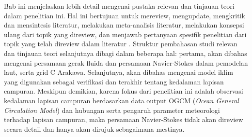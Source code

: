 \vspace{1.5pc}
\begin{spacing}{1.5}
	
	Bab ini menjelaskan lebih detail mengenai pustaka relevan dan tinjauan teori dalam penelitian ini. Hal ini bertujuan untuk mereview, mengupdate, mengkritik dan mensintesis literatur, melakukan meta-analisis literatur, melakukan konsepsi ulang dari topik yang direview, dan menjawab pertanyaan spesifik penelitian dari topik yang telah direview dalam literatur . Struktur pembahasan studi relevan dan tinjauan teori selanjutnya dibagi dalam beberapa hal: pertama, akan dibahas mengenai persamaan gerak fluida dan persamaan Navier-Stokes dalam pemodelan laut, serta grid C Arakawa. Selanjutnya, akan dibahas mengenai model iklim yang digunakan sebagai verifikasi dan terakhir tentang kedalaman lapisan campuran. Meskipun demikian, karena fokus dari penelitian ini adalah observasi kedalaman lapisan campuran berdasarkan data output OGCM (\textit{Ocean General Circulation Model}) dan hubungan serta pengaruh parameter meteorologi terhadap lapisan campuran, maka persamaan Navier-Stokes tidak akan direview secara detail dan hanya akan dirujuk sebagaimana mestinya.
	
\end{spacing}
\vspace{-0.1pc}
